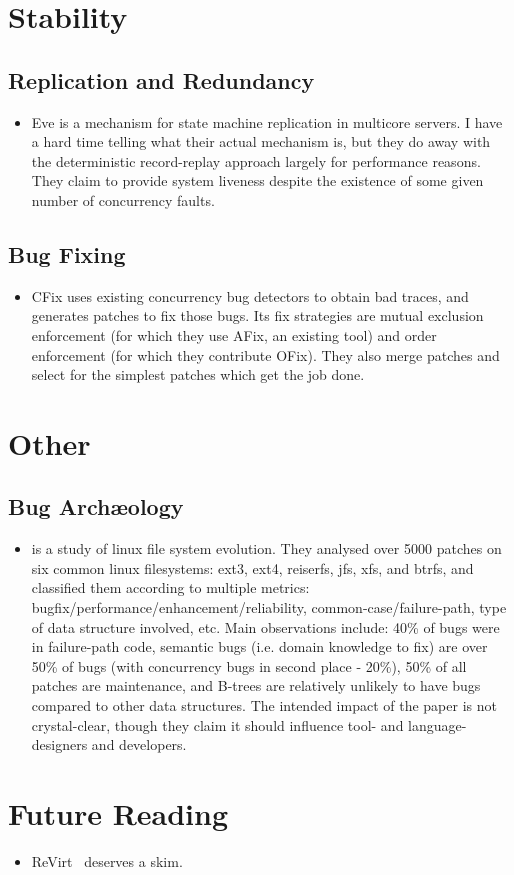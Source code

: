 \documentclass{article}
\begin{document}
\section{Stability}
\subsection{Replication and Redundancy}
\begin{itemize}
	\item Eve \cite{eve} is a mechanism for state machine replication in multicore servers. I have a hard time telling what their actual mechanism is, but they do away with the deterministic record-replay approach largely for performance reasons. They claim to provide system liveness despite the existence of some given number of concurrency faults.
\end{itemize}

\subsection{Bug Fixing}
\begin{itemize}
	\item CFix \cite{cfix} uses existing concurrency bug detectors to obtain bad traces, and generates patches to fix those bugs. Its fix strategies are mutual exclusion enforcement (for which they use AFix, an existing tool) and order enforcement (for which they contribute OFix). They also merge patches and select for the simplest patches which get the job done.
\end{itemize}


\section{Other}
\subsection{Bug Arch\ae{}ology}
\begin{itemize}
	\item \cite{evolution} is a study of linux file system evolution. They analysed over 5000 patches on six common linux filesystems: ext3, ext4, reiserfs, jfs, xfs, and btrfs, and classified them according to multiple metrics: bugfix/performance/enhancement/reliability, common-case/failure-path, type of data structure involved, etc.
		Main observations include: 40\% of bugs were in failure-path code, semantic bugs (i.e. domain knowledge to fix) are over 50\% of bugs (with concurrency bugs in second place - 20\%), 50\% of all patches are maintenance, and B-trees are relatively unlikely to have bugs compared to other data structures.
		The intended impact of the paper is not crystal-clear, though they claim it should influence tool- and language-designers and developers.
\end{itemize}

\section{Future Reading}
\begin{itemize}
	\item ReVirt~\cite{revirt} deserves a skim.
\end{itemize}

{}

\end{document}

